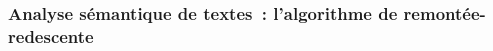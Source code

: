 {%






\subsubsection{Analyse sémantique de textes~: l'algorithme de
  remontée-redescente}\label{sec:remonte-redescente}




}
